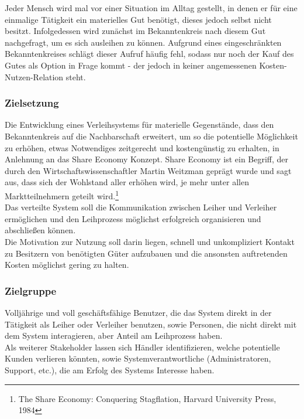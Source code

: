 
Jeder Mensch wird mal vor einer Situation im Alltag gestellt, in denen er für eine einmalige Tätigkeit ein materielles Gut benötigt, dieses jedoch selbst nicht besitzt. Infolgedessen wird zunächst im Bekanntenkreis nach diesem Gut nachgefragt, um es sich ausleihen zu können.
Aufgrund eines eingeschränkten Bekanntenkreises schlägt dieser Aufruf häufig fehl, sodass nur noch der Kauf des Gutes als Option in Frage kommt - der jedoch in keiner angemessenen Kosten-Nutzen-Relation steht.


\subsubsection{Zielsetzung}
Die Entwicklung eines Verleihsystems für materielle Gegenstände, dass den Bekanntenkreis auf die Nachbarschaft erweitert, um so die potentielle Möglichkeit zu erhöhen, etwas Notwendiges zeitgerecht und kostengünstig zu erhalten, in Anlehnung an das Share Economy Konzept.
Share Economy ist ein Begriff, der durch den Wirtschaftswissenschaftler Martin Weitzman geprägt wurde und sagt aus, dass sich der Wohlstand aller erhöhen wird, je mehr unter allen Marktteilnehmern geteilt wird.\footnote{The Share Economy: Conquering Stagflation, Harvard University Press, 1984}\\
Das verteilte System soll die Kommunikation zwischen Leiher und Verleiher ermöglichen und den Leihprozess möglichst erfolgreich organisieren und abschließen können.\\
Die Motivation zur Nutzung soll darin liegen, schnell und unkompliziert Kontakt zu Besitzern von benötigten Güter aufzubauen und die ansonsten auftretenden Kosten möglichst gering zu halten.


\subsubsection{Zielgruppe}
Volljährige und voll geschäftsfähige Benutzer, die das System direkt in der Tätigkeit als Leiher oder Verleiher benutzen, sowie Personen, die nicht direkt mit dem System interagieren, aber Anteil am Leihprozess haben.\\
Als weiterer Stakeholder lassen sich Händler identifizieren, welche potentielle Kunden verlieren könnten, sowie Systemverantwortliche (Administratoren, Support, etc.), die am Erfolg des Systems Interesse haben.



